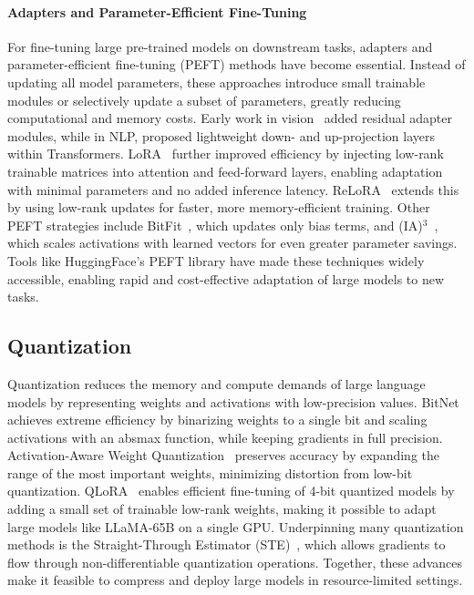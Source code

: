 \paragraph{Adapters and Parameter-Efficient Fine-Tuning}

For fine-tuning large pre-trained models on downstream tasks, adapters and parameter-efficient fine-tuning (PEFT) methods have become essential. Instead of updating all model parameters, these approaches introduce small trainable modules or selectively update a subset of parameters, greatly reducing computational and memory costs. Early work in vision~\citep{rebuffi2017adapters} added residual adapter modules, while in NLP, \citet{houlsby2019parameter} proposed lightweight down- and up-projection layers within Transformers. LoRA~\citep{hu2021lora} further improved efficiency by injecting low-rank trainable matrices into attention and feed-forward layers, enabling adaptation with minimal parameters and no added inference latency. ReLoRA~\citep{lialin2023relora} extends this by using low-rank updates for faster, more memory-efficient training. Other PEFT strategies include BitFit~\citep{benzaken2022bitfit}, which updates only bias terms, and (IA)$^3$~\citep{liu2022few}, which scales activations with learned vectors for even greater parameter savings. Tools like HuggingFace's PEFT library have made these techniques widely accessible, enabling rapid and cost-effective adaptation of large models to new tasks.

\subsection{Quantization}
Quantization reduces the memory and compute demands of large language models by representing weights and activations with low-precision values. BitNet~\citep{wang2023bitnet} achieves extreme efficiency by binarizing weights to a single bit and scaling activations with an absmax function, while keeping gradients in full precision. Activation-Aware Weight Quantization~\citep{lin2023awq} preserves accuracy by expanding the range of the most important weights, minimizing distortion from low-bit quantization. QLoRA~\citep{dettmers2023qlora} enables efficient fine-tuning of 4-bit quantized models by adding a small set of trainable low-rank weights, making it possible to adapt large models like LLaMA-65B on a single GPU. Underpinning many quantization methods is the Straight-Through Estimator (STE)~\citep{bengio2013estimating}, which allows gradients to flow through non-differentiable quantization operations. Together, these advances make it feasible to compress and deploy large models in resource-limited settings.

